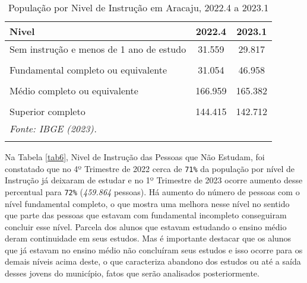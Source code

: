 \documentclass[preprint, 3p,
authoryear]{elsarticle} %
\begin{document}
\begin{longtable}[t]{lcc}
\caption{\label{tab:tab5}\label{tab5}População por Nivel de Instrução em Aracaju, 2022.4 a 2023.1}\\
\toprule
Nivel & 2022.4 & 2023.1\\
\midrule
Sem instrução e menos de 1 ano de estudo & 31.559 & 29.817\\
\cellcolor[HTML]{DCDCDC}{Fundamental incompleto ou equivalente} & \cellcolor[HTML]{DCDCDC}{179.191} & \cellcolor[HTML]{DCDCDC}{163.326}\\
Fundamental completo ou equivalente & 31.054 & 46.958\\
\cellcolor[HTML]{DCDCDC}{Médio incompleto ou equivalente} & \cellcolor[HTML]{DCDCDC}{40.117} & \cellcolor[HTML]{DCDCDC}{42.550}\\
Médio completo ou equivalente & 166.959 & 165.382\\
\addlinespace
\cellcolor[HTML]{DCDCDC}{Superior incompleto ou equivalente} & \cellcolor[HTML]{DCDCDC}{46.322} & \cellcolor[HTML]{DCDCDC}{45.517}\\
Superior completo & 144.415 & 142.712\\
\bottomrule
\multicolumn{3}{l}{\rule{0pt}{1em}\textit{Fonte: IBGE (2023).}}\\
\multicolumn{3}{l}{\rule{0pt}{1em}}\\
\end{longtable}
\endgroup{}

Na Tabela \ref{tab6}, Nivel de Instrução das Pessoas que Não Estudam,
foi constatado que no 4º Trimestre de 2022 cerca de \texttt{71\%} da
população por nível de Instrução já deixaram de estudar e no 1º
Trimestre de 2023 ocorre aumento desse percentual para \texttt{72\%}
(\emph{459.864} pessoas). Há aumento do número de pessoas com o nível
fundamental completo, o que mostra uma melhora nesse nível no sentido
que parte das pessoas que estavam com fundamental incompleto conseguiram
concluir esse nível. Parcela dos alunos que estavam estudando o ensino
médio deram continuidade em seus estudos. Mas é importante destacar que
os alunos que já estavam no ensino médio não concluíram seus estudos e
isso ocorre para os demais níveis acima deste, o que caracteriza
abandono dos estudos ou até a saída desses jovens do município, fatos
que serão analisados posteriormente.

\begingroup\fontsize{9}{11}\selectfont
\end{document}
